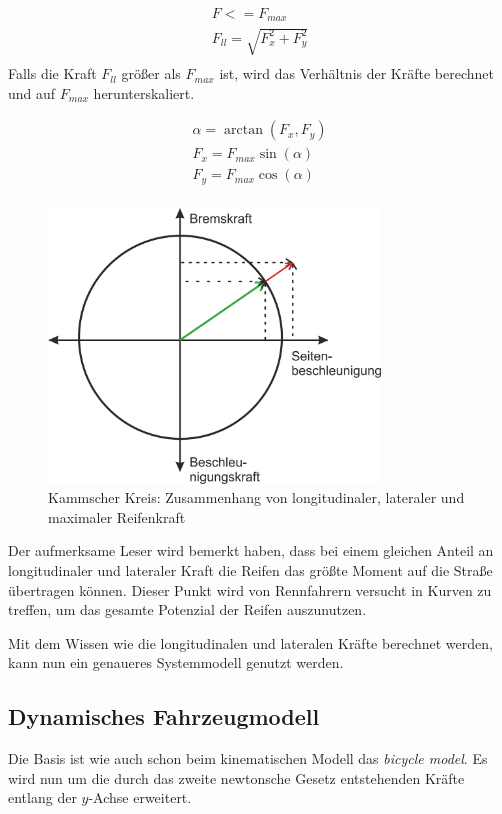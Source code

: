 \documentclass{like}
\begin{document}
\begin{eqnarray}
F <= F_{max} \\
F_{ll} = \sqrt{F_x^2 + F_y^2}  \\
\end{eqnarray}
Falls die Kraft $F_{ll}$ größer als $F_{max}$ ist, wird das Verhältnis der Kräfte berechnet und auf $F_{max}$ herunterskaliert.

\begin{eqnarray}
\alpha = \arctan(F_x, F_y)\\
F_x = F_{max} \sin(\alpha)\\
F_y = F_{max} \cos(\alpha)\\ 
\end{eqnarray}

\begin{figure}[ht!]
	\centering
	\includegraphics[width=250pt]{Abbildungen/kamKreis.png}
	\caption{Kammscher Kreis: Zusammenhang von longitudinaler, lateraler und maximaler Reifenkraft}
	\label{fig:kamKreis}
\end{figure}

Der aufmerksame Leser wird bemerkt haben, dass bei einem gleichen Anteil an longitudinaler und lateraler Kraft die Reifen das größte Moment auf die Straße übertragen können. Dieser Punkt wird von Rennfahrern versucht in Kurven zu treffen, um das gesamte Potenzial der Reifen auszunutzen.


Mit dem Wissen wie die longitudinalen und lateralen Kräfte berechnet werden, kann nun ein genaueres Systemmodell genutzt werden.

\subsection{Dynamisches Fahrzeugmodell}
\label{dynModel}

Die Basis ist wie auch schon beim kinematischen Modell das \textit{bicycle model}. Es wird nun um die durch das zweite newtonsche Gesetz entstehenden Kräfte entlang der \(y\)-Achse erweitert.
\end{document}
